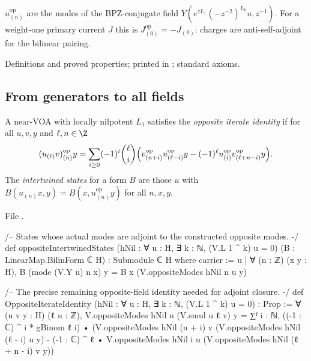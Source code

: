 \begin{physics}
$u^{\mathrm{op}}_{(n)}$ are the modes of the BPZ-conjugate field $Y(e^{zL_1}(-z^{-2})^{L_0}u,z^{-1})$.  For a weight-one primary
current $J$ this is $J^{\mathrm{op}}_{(0)}=-J_{(0)}$: charges are anti-self-adjoint for the bilinear pairing.
\end{physics}

\begin{status}
Definitions and proved properties; printed in ; standard axioms.
\end{status}

\subsection{From generators to all fields}

\begin{definition}\label{ch17:def:oppiterate}
A near-VOA with locally nilpotent $L_1$ satisfies the \emph{opposite iterate identity} if for all $u,v,y$ and $\ell,n\in\Z$
\begin{equation*}
  (u_{(\ell)}v)^{\mathrm{op}}_{(n)}y=\sum_{i\ge0}(-1)^i\binom\ell i\Bigl(v^{\mathrm{op}}_{(n+i)}u^{\mathrm{op}}_{(\ell-i)}y-(-1)^\ell u^{\mathrm{op}}_{(i)}v^{\mathrm{op}}_{(\ell+n-i)}y\Bigr).
\end{equation*}
The \emph{intertwined states} for a form $B$ are those $u$ with $B(u_{(n)}x,y)=B(x,u^{\mathrm{op}}_{(n)}y)$ for all $n,x,y$.
\end{definition}

\noindent File .
\begin{leancode}
/-- States whose actual modes are adjoint to the constructed opposite modes. -/
def oppositeIntertwinedStates (hNil : ∀ u : H, ∃ k : ℕ, (V.L 1 ^ k) u = 0)
    (B : LinearMap.BilinForm ℂ H) : Submodule ℂ H where
  carrier := {u | ∀ (n : ℤ) (x y : H),
    B (mode (V.Y u) n x) y = B x (V.oppositeModes hNil n u y)}

/-- The precise remaining opposite-field identity needed for adjoint closure. -/
def OppositeIterateIdentity (hNil : ∀ u : H, ∃ k : ℕ, (V.L 1 ^ k) u = 0) : Prop :=
  ∀ (u v y : H) (ℓ n : ℤ),
    V.oppositeModes hNil n (V.smul u ℓ v) y =
      ∑ᶠ i : ℕ, ((-1 : ℂ) ^ i * gBinom ℓ i) •
        (V.oppositeModes hNil (n + i) v (V.oppositeModes hNil (ℓ - i) u y) -
          (-1 : ℂ) ^ ℓ • V.oppositeModes hNil i u
            (V.oppositeModes hNil (ℓ + n - i) v y))
\end{leancode}

